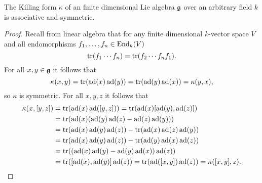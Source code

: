 \begin{lem}\label{lem: killing form is associative and symmetric}
 The Killing form $\kappa$ of an finite dimensional Lie algebra $\g$ over an arbitrary field $k$ is associative and symmetric.
\end{lem}
\begin{proof}
 Recall from linear algebra that for any finite dimensional $k$-vector space $V$ and all endomorphisms $f_1, \dotsc, f_n \in \End_k(V)$
 \[
  \tr(f_1 \dotsm f_n) = \tr(f_2 \dotsm f_n f_1).
 \]
 For all $x,y \in \g$ it follows that
 \[
  \kappa(x,y) = \tr(\ad(x) \ad(y)) = \tr(\ad(y) \ad(x)) = \kappa(y,x),
 \]
 so $\kappa$ is symmetric. For all $x,y,z$ it follows that
 \begin{align*}
  \kappa(x,[y,z])
  &= \tr(\ad(x) \ad([y,z]))
  = \tr(\ad(x) [\ad(y), \ad(z)]) \\
  &= \tr(\ad(x) (\ad(y) \ad(z) - \ad(z) \ad(y))) \\
  &= \tr(\ad(x) \ad(y) \ad(z)) - \tr(\ad(x) \ad(z) \ad(y)) \\
  &= \tr(\ad(x) \ad(y) \ad(z)) - \tr(\ad(y) \ad(x) \ad(z)) \\
  &= \tr((\ad(x) \ad(y)- \ad(y) \ad(x)) \ad(z)) \\
  &= \tr([\ad(x), \ad(y)] \ad(z))
  = \tr(\ad([x,y]) \ad(z))
  = \kappa([x,y],z).
 \qedhere
 \end{align*}
\end{proof}


